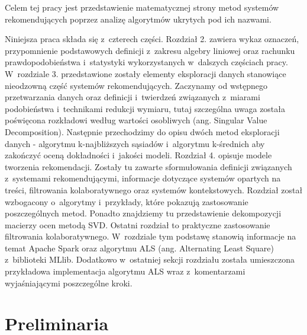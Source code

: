 \documentclass[12pt,a4paper]{report}
\begin{document}
Celem tej pracy jest przedstawienie matematycznej strony metod systemów rekomendujących poprzez analizę algorytmów ukrytych pod ich nazwami.

Niniejsza praca składa się z~czterech części. Rozdział 2. zawiera wykaz oznaczeń, przypomnienie podstawowych definicji z~zakresu algebry liniowej oraz rachunku prawdopodobieństwa i~statystyki wykorzystanych w~dalszych częściach pracy. W~rozdziale 3. przedstawione zostały elementy eksploracji danych stanowiące nieodzowną część systemów rekomendujących. Zaczynamy od wstępnego przetwarzania danych oraz definicji i~twierdzeń związanych z~miarami podobieństwa i~technikami redukcji wymiaru, tutaj szczególna uwaga została poświęcona rozkładowi według wartości osobliwych (ang. Singular Value Decomposition). Następnie przechodzimy do opisu dwóch metod eksploracji danych - algorytmu k-najbliższych sąsiadów i~algorytmu k-średnich aby zakończyć oceną dokładności i~jakości modeli. 
Rozdział 4. opisuje modele tworzenia rekomendacji. Zostały tu zawarte sformułowania definicji związanych z~systemami rekomendującymi, informacje dotyczące systemów opartych na treści, filtrowania kolaboratywnego oraz systemów kontekstowych. Rozdział został wzbogacony o~algorytmy i~przykłady, które pokazują zastosowanie poszczególnych metod. Ponadto znajdziemy tu przedstawienie dekompozycji macierzy ocen metodą SVD. Ostatni rozdział to praktyczne zastosowanie filtrowania kolaboratywnego. W~rozdziale tym podstawę stanowią informacje na temat Apache Spark oraz algorytmu ALS (ang. Alternating Least Square) z~biblioteki MLlib. Dodatkowo w~ostatniej sekcji rozdziału została umieszczona przykładowa implementacja algorytmu ALS wraz z~komentarzami wyjaśniającymi poszczególne kroki. 



\chapter{Preliminaria} %
\end{document}
